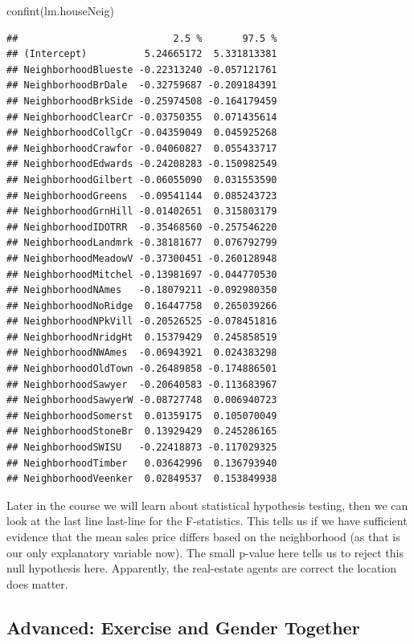 \documentclass[
]{book}
\newenvironment{Shaded}{\begin{snugshade}}{\end{snugshade}}
\newcommand{\FunctionTok}[1]{\textcolor[rgb]{0.00,0.00,0.00}{#1}}
\newcommand{\NormalTok}[1]{#1}
\theoremstyle{definition}
\theoremstyle{definition}
\theoremstyle{definition}
\theoremstyle{definition}
\theoremstyle{remark}
\begin{document}
\begin{Shaded}
\begin{Highlighting}[]
\FunctionTok{confint}\NormalTok{(lm.houseNeig)}
\end{Highlighting}
\end{Shaded}

\begin{verbatim}
##                           2.5 %       97.5 %
## (Intercept)          5.24665172  5.331813381
## NeighborhoodBlueste -0.22313240 -0.057121761
## NeighborhoodBrDale  -0.32759687 -0.209184391
## NeighborhoodBrkSide -0.25974508 -0.164179459
## NeighborhoodClearCr -0.03750355  0.071435614
## NeighborhoodCollgCr -0.04359049  0.045925268
## NeighborhoodCrawfor -0.04060827  0.055433717
## NeighborhoodEdwards -0.24208283 -0.150982549
## NeighborhoodGilbert -0.06055090  0.031553590
## NeighborhoodGreens  -0.09541144  0.085243723
## NeighborhoodGrnHill -0.01402651  0.315803179
## NeighborhoodIDOTRR  -0.35468560 -0.257546220
## NeighborhoodLandmrk -0.38181677  0.076792799
## NeighborhoodMeadowV -0.37300451 -0.260128948
## NeighborhoodMitchel -0.13981697 -0.044770530
## NeighborhoodNAmes   -0.18079211 -0.092980350
## NeighborhoodNoRidge  0.16447758  0.265039266
## NeighborhoodNPkVill -0.20526525 -0.078451816
## NeighborhoodNridgHt  0.15379429  0.245858519
## NeighborhoodNWAmes  -0.06943921  0.024383298
## NeighborhoodOldTown -0.26489858 -0.174886501
## NeighborhoodSawyer  -0.20640583 -0.113683967
## NeighborhoodSawyerW -0.08727748  0.006940723
## NeighborhoodSomerst  0.01359175  0.105070049
## NeighborhoodStoneBr  0.13929429  0.245286165
## NeighborhoodSWISU   -0.22418873 -0.117029325
## NeighborhoodTimber   0.03642996  0.136793940
## NeighborhoodVeenker  0.02849537  0.153849938
\end{verbatim}

Later in the course we will learn about statistical hypothesis testing, then we can look at the last line last-line for the F-statistics. This tells us if we have sufficient evidence that the mean sales price differs based on the neighborhood (as that is our only explanatory variable now). The small p-value here tells us to reject this null hypothesis here. Apparently, the real-estate agents are correct the location does matter.

\hypertarget{advanced-exercise-and-gender-together}{%
\subsection{Advanced: Exercise and Gender Together}\label{advanced-exercise-and-gender-together}}
\end{document}
